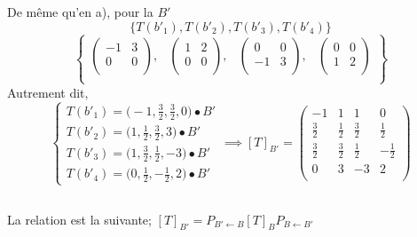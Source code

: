 \subsection{}
De même qu'en a), pour la $B'$ 
\[\{T(b'_1),T(b'_2),T(b'_3),T(b'_4)\}\]
\[
\begin{Bmatrix}
\left(
\begin{array}{cc}
-1 & 3 \\
0 & 0 \\
\end{array}
\right), & \left(
\begin{array}{cc}
1 & 2 \\
0 & 0 \\
\end{array}
\right), & \left(
\begin{array}{cc}
0 & 0 \\
-1 & 3 \\
\end{array}
\right), & \left(
\begin{array}{cc}
0 & 0 \\
1 & 2 \\
\end{array}
\right) \\
\end{Bmatrix}
\]
Autrement dit,
\[\begin{cases}
T(b'_1)=\Big(-1,\frac{3}{2},\frac{3}{2},0\Big)\bullet B'\\
T(b'_2)=\Big(1,\frac{1}{2},\frac{3}{2},3\Big)\bullet B'\\
T(b'_3)=\Big(1,\frac{3}{2},\frac{1}{2},-3\Big)\bullet B'\\
T(b'_4)=\Big(0,\frac{1}{2},-\frac{1}{2},2\Big)\bullet B'
\end{cases}\implies [T]_{B'}=
\begin{pmatrix}
-1 & 1 & 1 & 0 \\
\frac{3}{2} & \frac{1}{2} & \frac{3}{2} & \frac{1}{2} \\
\frac{3}{2} & \frac{3}{2} & \frac{1}{2} & -\frac{1}{2} \\
0 & 3 & -3 & 2 \\
\end{pmatrix}
\]
\subsection{}
La relation est la suivante;
 $[T]_{B'}=P_{B'\leftarrow B}[T]_B P_{B\leftarrow B'}$ 
